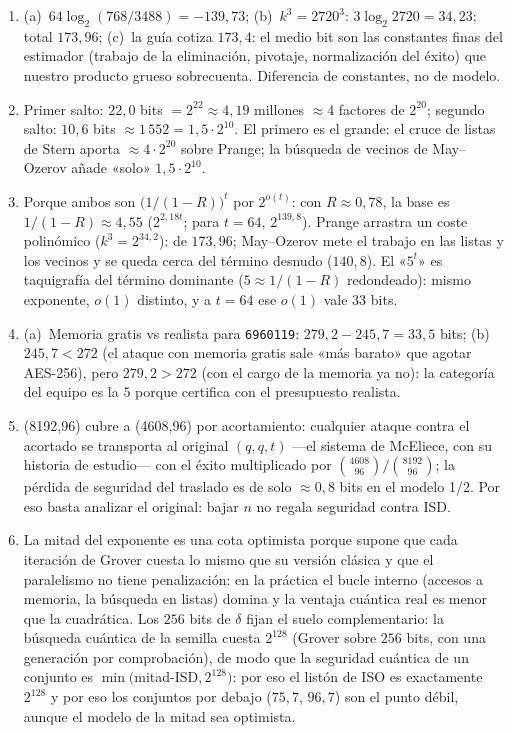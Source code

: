 \documentclass[11pt,a4paper,oneside]{report}
\begin{document}
\begin{enumerate}[leftmargin=1.9em,itemsep=4pt]
  \item (a)~$64\log_2(768/3488)=-139{,}73$;
        (b)~$k^3=2720^3$: $3\log_2 2720=34{,}23$; total
        $173{,}96$; (c)~la guía cotiza $173{,}4$: el medio bit son
        las constantes finas del estimador (trabajo de la
        eliminación, pivotaje, normalización del éxito) que
        nuestro producto grueso sobrecuenta. Diferencia de
        constantes, no de modelo.
  \item Primer salto: $22{,}0$ bits $=2^{22}\approx4{,}19$ millones
        $\approx4$ factores de $2^{20}$; segundo salto: $10{,}6$
        bits $\approx1\,552=1{,}5\cdot2^{10}$. El primero es
        el grande: el cruce de listas de Stern aporta
        $\approx4\cdot2^{20}$ sobre Prange; la búsqueda de vecinos
        de May--Ozerov añade «solo» $1{,}5\cdot2^{10}$.
  \item Porque ambos son $\bigl(1/(1-R)\bigr)^{t}$ por
        $2^{o(t)}$: con $R\approx0{,}78$, la base es
        $1/(1-R)\approx4{,}55$ ($2^{2{,}18t}$; para $t=64$,
        $2^{139{,}8}$). Prange arrastra un coste polinómico
        ($k^3=2^{34{,}2}$): de $173{,}96$; May--Ozerov mete el
        trabajo en las listas y los vecinos y se queda cerca del
        término desnudo ($140{,}8$). El «$5^t$» es taquigrafía del
        término dominante ($5\approx1/(1-R)$ redondeado): mismo
        exponente, $o(1)$ distinto, y a $t=64$ ese $o(1)$ vale
        $33$ bits.
  \item (a)~Memoria gratis vs realista para \texttt{6960119}:
        $279{,}2-245{,}7=33{,}5$ bits; (b)~$245{,}7<272$ (el
        ataque con memoria gratis sale «más barato» que agotar
        AES-256), pero $279{,}2>272$ (con el cargo de la memoria
        ya no): la categoría del equipo es la $5$ porque certifica
        con el presupuesto realista.
  \item (8192,96) cubre a (4608,96) por acortamiento: cualquier
        ataque contra el acortado se transporta al original $(q,q,t)$
        ---el sistema de McEliece, con su historia de estudio--- con
        el éxito multiplicado por $\binom{4608}{96}/\binom{8192}{96}$;
        la pérdida de seguridad del traslado es de solo
        $\approx0{,}8$ bits en el modelo 1/2. Por eso basta analizar
        el original: bajar $n$ no regala seguridad contra ISD.
  \item La mitad del exponente es una cota optimista porque
        supone que cada iteración de Grover cuesta lo mismo que su
        versión clásica y que el paralelismo no tiene penalización:
        en la práctica el bucle interno (accesos a memoria, la
        búsqueda en listas) domina y la ventaja cuántica real es
        menor que la cuadrática. Los $256$ bits de $\delta$ fijan
        el suelo complementario: la búsqueda cuántica de la semilla
        cuesta $2^{128}$ (Grover sobre $256$ bits, con una
        generación por comprobación), de modo que la seguridad
        cuántica de un conjunto es $\min($mitad-ISD$,2^{128})$: por
        eso el listón de ISO es exactamente $2^{128}$ y por eso los
        conjuntos por debajo ($75{,}7$, $96{,}7$) son el punto
        débil, aunque el modelo de la mitad sea optimista.
\end{enumerate}
\end{document}
